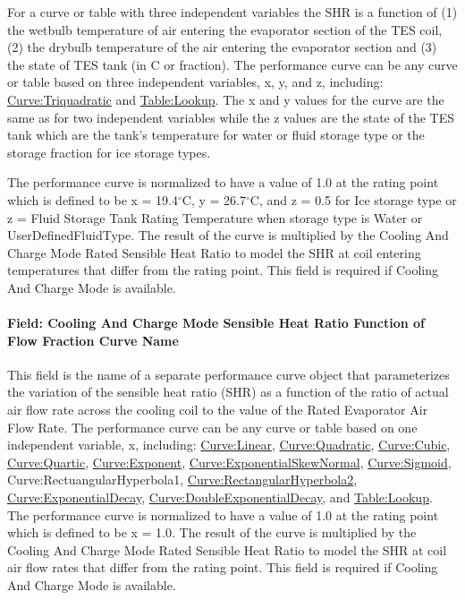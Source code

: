 For a curve or table with three independent variables the SHR is a function of (1) the wetbulb temperature of air entering the evaporator section of the TES coil, (2) the drybulb temperature of the air entering the evaporator section and (3) the state of TES tank (in C or fraction). The performance curve can be any curve or table based on three independent variables, x, y, and z, including: \hyperref[curvetriquadratic]{Curve:Triquadratic} and \hyperref[tablelookup]{Table:Lookup}. The x and y values for the curve are the same as for two independent variables while the z values are the state of the TES tank which are the tank's temperature for water or fluid storage type or the storage fraction for ice storage types.

The performance curve is normalized to have a value of 1.0 at the rating point which is defined to be x = 19.4$^\circ$C, y = 26.7$^\circ$C, and z = 0.5 for Ice storage type or z = Fluid Storage Tank Rating Temperature when storage type is Water or UserDefinedFluidType. The result of the curve is multiplied by the Cooling And Charge Mode Rated Sensible Heat Ratio to model the SHR at coil entering temperatures that differ from the rating point. This field is required if Cooling And Charge Mode is available.

\paragraph{Field: Cooling And Charge Mode Sensible Heat Ratio Function of Flow Fraction Curve Name}\label{field-cooling-and-charge-mode-sensible-heat-ratio-function-of-flow-fraction-curve-name}

This field is the name of a separate performance curve object that parameterizes the variation of the sensible heat ratio (SHR) as a function of the ratio of actual air flow rate across the cooling coil to the value of the Rated Evaporator Air Flow Rate. The performance curve can be any curve or table based on one independent variable, x, including: \hyperref[curvelinear]{Curve:Linear}, \hyperref[curvequadratic]{Curve:Quadratic}, \hyperref[curvecubic]{Curve:Cubic}, \hyperref[curvequartic]{Curve:Quartic}, \hyperref[curveexponent]{Curve:Exponent}, \hyperref[curveexponentialskewnormal]{Curve:ExponentialSkewNormal}, \hyperref[curvesigmoid]{Curve:Sigmoid}, Curve:RectuangularHyperbola1, \hyperref[curverectangularhyperbola2]{Curve:RectangularHyperbola2}, \hyperref[curveexponentialdecay]{Curve:ExponentialDecay}, \hyperref[curvedoubleexponentialdecay]{Curve:DoubleExponentialDecay}, and \hyperref[tablelookup]{Table:Lookup}. The performance curve is normalized to have a value of 1.0 at the rating point which is defined to be x = 1.0. The result of the curve is multiplied by the Cooling And Charge Mode Rated Sensible Heat Ratio to model the SHR at coil air flow rates that differ from the rating point. This field is required if Cooling And Charge Mode is available.

